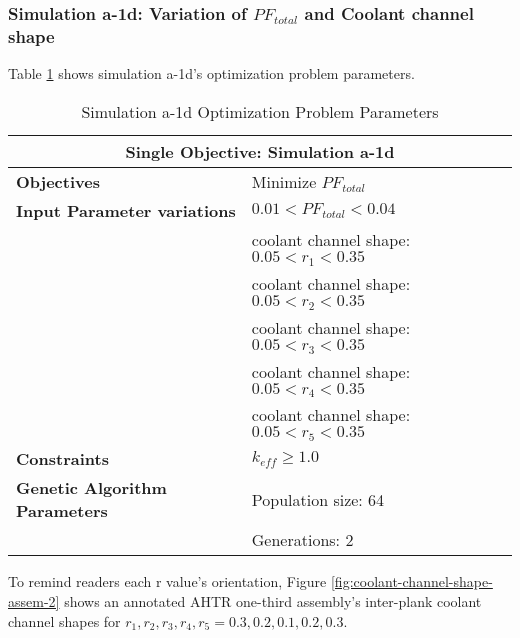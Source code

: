 \subsubsection{Simulation a-1d: Variation of $PF_{total}$ and Coolant channel shape}
Table \ref{tab:simulationa1d} shows simulation a-1d's optimization problem parameters. 
\begin{table}[htbp!]
    \centering
    \onehalfspacing
    \caption{Simulation a-1d Optimization Problem Parameters}
	\label{tab:simulationa1d}
    \footnotesize
    \begin{tabular}{l|p{6cm}}
    \hline 
    \multicolumn{2}{c}{\textbf{Single Objective: Simulation a-1d}} \\
    \hline 
    \textbf{Objectives} & Minimize $PF_{total}$ \\
    \hline 
    \textbf{Input Parameter variations} & $0.01<PF_{total}<0.04$ \\
    & coolant channel shape: $0.05<r_{1}<0.35$ \\
    & coolant channel shape: $0.05<r_{2}<0.35$ \\
    & coolant channel shape: $0.05<r_{3}<0.35$ \\
    & coolant channel shape: $0.05<r_{4}<0.35$ \\
    & coolant channel shape: $0.05<r_{5}<0.35$ \\
    \hline
    \textbf{Constraints} & $k_{eff} \geq 1.0$\\ 
    \hline 
    \textbf{Genetic Algorithm Parameters} & Population size: 64 \\
    & Generations: 2 \\
    \hline
    \end{tabular}
\end{table}
To remind readers each r value's orientation, Figure 
\ref{fig:coolant-channel-shape-assem-2} shows an annotated \gls{AHTR} one-third 
assembly's inter-plank coolant channel shapes for 
$r_1, r_2, r_3, r_4, r_5 = 0.3, 0.2, 0.1, 0.2, 0.3$.
